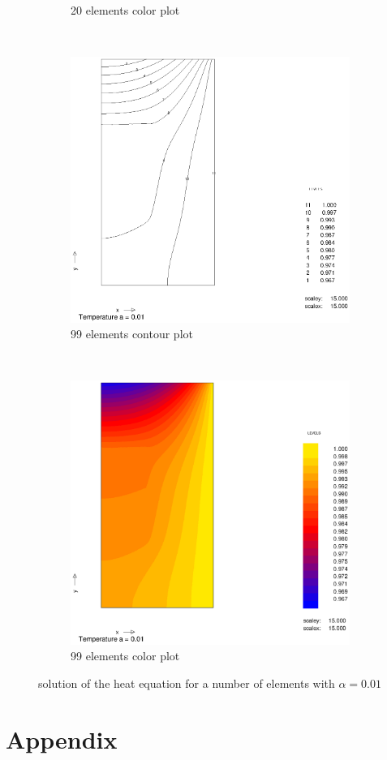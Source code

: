\documentclass[10pt,a4paper]{article}
\begin{document}
\begin{figure}[h]
\begin{subfigure}[b]{0.45\textwidth}
                \caption{20 elements color plot}
                \label{fig:colplot_a001_50el}
        \end{subfigure}
        ~
        \begin{subfigure}[b]{0.45\textwidth}
                \includegraphics[width=\textwidth]{cont_a001_99el}
                \caption{99 elements contour plot}
                \label{fig:cont_a001_99el}
        \end{subfigure}
        ~ 
        \begin{subfigure}[b]{0.45\textwidth}
                \includegraphics[width=\textwidth]{colplot_a001_99el}
                \caption{99 elements color plot}
                \label{fig:colplot_a001_99el}
        \end{subfigure}
        \caption{solution of the heat equation for a number of elements with $\alpha = 0.01$} 
        \label{fig:10}                                
\end{figure}
\section{Appendix}
\end{document}
